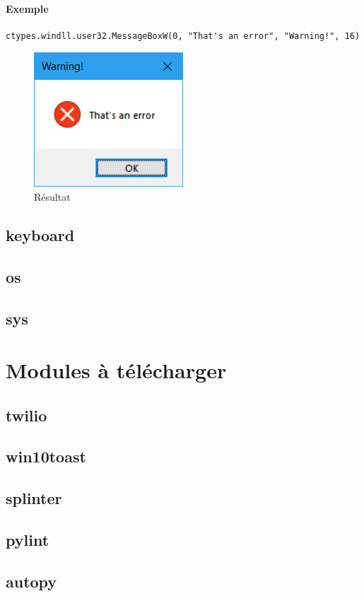 \documentclass[a4paper, 10pt]{article}
\begin{document}
\paragraph{Exemple}
\begin{verbatim}
ctypes.windll.user32.MessageBoxW(0, "That's an error", "Warning!", 16)
\end{verbatim}
\begin{figure}[h]
\begin{center}
\includegraphics[scale=0.5]{errorwindow.png}
\caption*{Résultat}
\end{center}
\end{figure}

\subsection{keyboard}
\subsection{os}
\subsection{sys}

\section{Modules à télécharger}
\subsection{twilio}
\subsection{win10toast}
\subsection{splinter}
\subsection{pylint}

\subsection{autopy}


\printindex 
\end{document}
